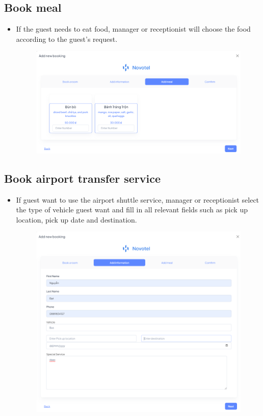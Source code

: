     \subsection{Book meal}
    \begin{itemize}
        \item If the guest needs to eat food, manager or receptionist will choose the food according to the guest's request.
        \begin{figure}[H]
            \includegraphics[width=1\linewidth]{img/bookmeal.png}
            \label{fig:bookmeal}
        \end{figure}
    \end{itemize}
    \subsection{Book airport transfer service}
    \begin{itemize}
        \item  If guest want to use the airport shuttle service, manager or receptionist select the type of vehicle guest want and fill in all relevant fields such as pick up location, pick up date and destination.
        \begin{figure}[H]
            \includegraphics[width=1\linewidth]{img/addinfor.png}
            \label{fig:bookvehicle}
        \end{figure}
    \end{itemize}
